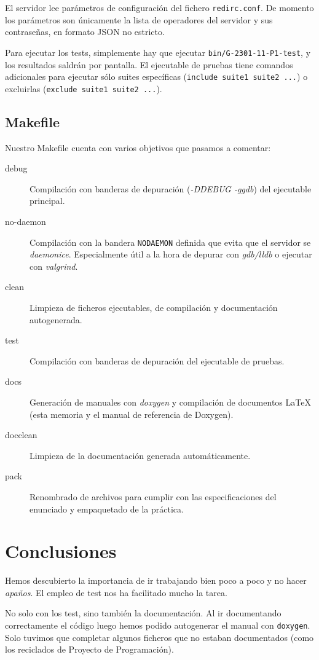 \documentclass{article}
\begin{document}
El servidor lee parámetros de configuración del fichero \texttt{redirc.conf}. De momento los parámetros son únicamente la lista de operadores del servidor y sus contraseñas, en formato JSON no estricto.

Para ejecutar los tests, simplemente hay que ejecutar \texttt{bin/G-2301-11-P1-test}, y los resultados saldrán por pantalla. El ejecutable de pruebas tiene comandos adicionales para ejecutar sólo suites específicas (\texttt{include suite1 suite2 ...}) o excluirlas (\texttt{exclude suite1 suite2 ...}).

\subsection{Makefile}

Nuestro Makefile cuenta con varios objetivos que pasamos a comentar:

\begin{description}
\item[debug] Compilación con banderas de depuración (\textit{-DDEBUG -ggdb}) del ejecutable principal.
\item[no-daemon] Compilación con la bandera \texttt{NODAEMON} definida que evita que el servidor se \textit{daemonice}. Especialmente útil a la hora de depurar con \textit{gdb/lldb} o ejecutar con \textit{valgrind}.
\item[clean] Limpieza de ficheros ejecutables, de compilación y documentación autogenerada.
\item[test] Compilación con banderas de depuración del ejecutable de pruebas.
\item[docs] Generación de manuales con \textit{doxygen} y compilación de documentos LaTeX (esta memoria y el manual de referencia de Doxygen). 
\item[docclean] Limpieza de la documentación generada automáticamente.
\item[pack] Renombrado de archivos para cumplir con las especificaciones del enunciado y empaquetado de la práctica.
\end{description}

\section{Conclusiones}

Hemos descubierto la importancia de ir trabajando bien poco a poco y no hacer \textit{apaños}. El empleo de test nos ha facilitado mucho la tarea. 

No solo con los test, sino también la documentación. Al ir documentando correctamente el código luego hemos podido autogenerar el manual con \texttt{doxygen}. Solo tuvimos que completar algunos ficheros que no estaban documentados (como los reciclados de Proyecto de Programación).
\end{document}
